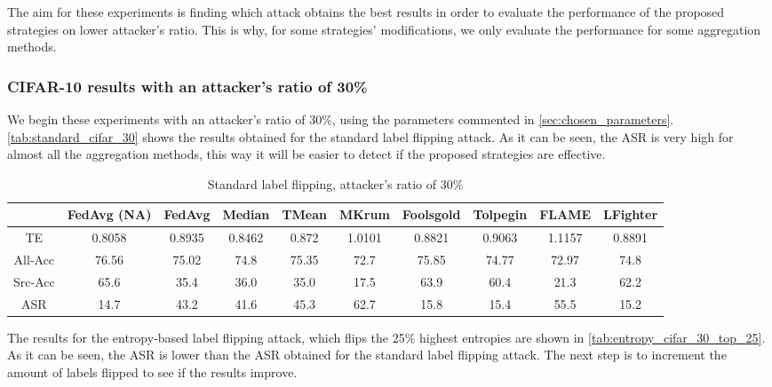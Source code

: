 The aim for these experiments is finding which attack obtains the best results in order to evaluate the performance of the proposed strategies on lower attacker's ratio. This is why, for some strategies' modifications, we only evaluate the performance for some aggregation methods.

\subsubsection{CIFAR-10 results with an attacker's ratio of 30\%}\label{sec:cifar_30}
We begin these experiments with an attacker's ratio of 30\%, using the parameters commented in \ref{sec:chosen_parameters}.
\autoref{tab:standard_cifar_30} shows the results obtained for the standard label flipping attack.
As it can be seen, the ASR is very high for almost all the aggregation methods, this way it will be easier to detect if the proposed strategies are effective.

\begin{table}[h!]
        \centering
        \small
        \begin{adjustbox}{center}
        \begin{tabular}{|c|c|c|c|c|c|c|c|c|c|}
            \hline
            & FedAvg (NA) & FedAvg & Median & TMean & MKrum & Foolsgold & Tolpegin & FLAME & LFighter \\
            \hline
            TE & 0.8058 & 0.8935 & 0.8462 & 0.872 & 1.0101 & 0.8821 & 0.9063 & 1.1157 & 0.8891 \\
            \hline
            All-Acc & 76.56 & 75.02 & 74.8 & 75.35 & 72.7 & 75.85 & 74.77 & 72.97 & 74.8 \\
            \hline
            Src-Acc & 65.6 & 35.4 & 36.0 & 35.0 & 17.5 & 63.9 & 60.4 & 21.3 & 62.2 \\
            \hline
            ASR & 14.7 & 43.2 & 41.6 & 45.3 & 62.7 & 15.8 & 15.4 & 55.5 & 15.2 \\
            \hline
        \end{tabular}
        \end{adjustbox}
        \caption{Standard label flipping, attacker's ratio of 30\%}
        \label{tab:standard_cifar_30}
\end{table}

The results for the entropy-based label flipping attack, which flips the 25\% highest entropies are shown in \autoref{tab:entropy_cifar_30_top_25}.
As it can be seen, the ASR is lower than the ASR obtained for the standard label flipping attack. The next step is to increment the amount of labels flipped to see if the results improve.

